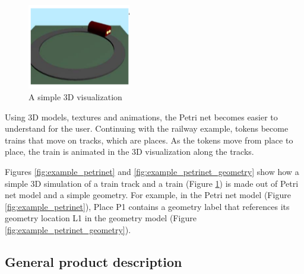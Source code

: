 \begin{figure}[htp]
\begin{center}
  \includegraphics[width=0.4\textwidth]{image/3d.png}
  \caption{A simple 3D visualization}
  \label{fig:example_3d}
\end{center}
\end{figure}

%

Using 3D models, textures and animations, the Petri net becomes easier to understand for the user. Continuing with the railway example, tokens become trains that move on tracks, which are places. As the tokens move from place to place, the train is animated in the 3D visualization along the tracks.

Figures \ref{fig:example_petrinet} and \ref{fig:example_petrinet_geometry} show how a simple 3D simulation of a train track and a train (Figure \ref{fig:example_3d}) is made out of Petri net model and a simple geometry. For example, in the Petri net model (Figure \ref{fig:example_petrinet}), Place P1 contains a geometry label that references its geometry location L1 in the geometry model (Figure \ref{fig:example_petrinet_geometry}).

\subsection{General product description}

